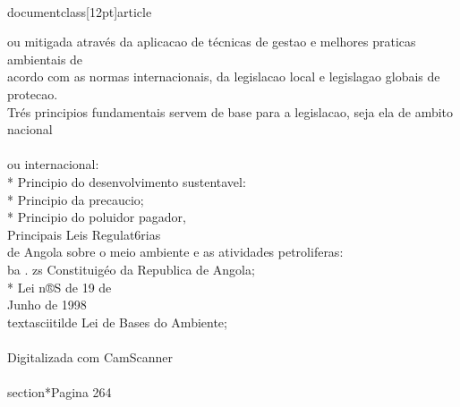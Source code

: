 \\documentclass[12pt]{article}
\begin{document}
{{{{ou mitigada através da aplicacao de técnicas de gestao e melhores praticas ambientais de\\
acordo com as normas internacionais, da legislacao local e legislagao globais de protecao.\\
Trés principios fundamentais servem de base para a legislacao, seja ela de ambito nacional\\
\\
ou internacional:\\
* Principio do desenvolvimento sustentavel:\\
* Principio da precaucio;\\
* Principio do poluidor pagador,\\
Principais Leis Regulat6rias\\
de Angola sobre o meio ambiente e as atividades petroliferas:\\
ba . zs Constituigéo da Republica de Angola;\\
* Lei n®S de 19 de\\
Junho de 1998 \\textasciitilde{} Lei de Bases do Ambiente;\\
\\
Digitalizada com CamScanner\\

\\section*{Pagina 264}

}}}}
\end{document}
